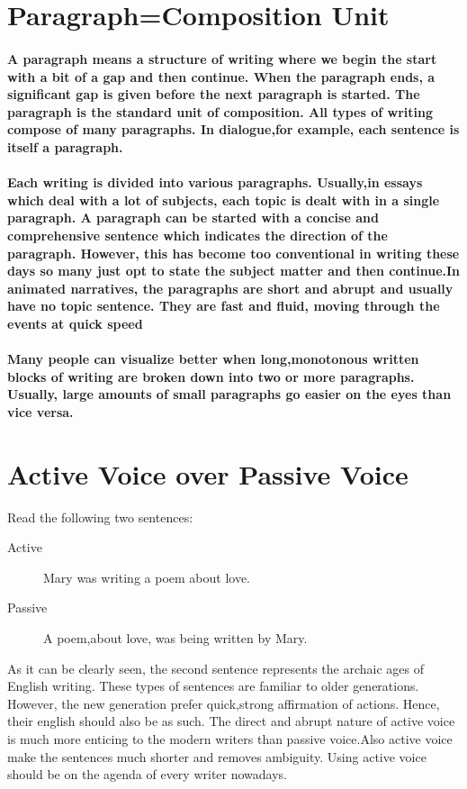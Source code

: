 \documentclass{report}
\begin{document}
\section{Paragraph=Composition Unit}
\paragraph{A paragraph means a structure of writing where we begin the start with a bit of a gap and then continue. When the paragraph ends, a significant gap is given before the next paragraph is started. The paragraph is the standard unit of composition. All types of writing compose of many paragraphs. In dialogue,for example, each sentence is itself a paragraph.}
\paragraph{Each writing is divided into various paragraphs. Usually,in essays which deal with a lot of subjects, each topic is dealt with in a single paragraph. A paragraph can be started with a concise and comprehensive sentence which indicates the direction of the paragraph. However, this has become too conventional in writing these days so many just opt to state the subject matter and then continue.In animated narratives, the paragraphs are short and abrupt and usually have no topic sentence. They are fast and fluid, moving through the events at quick speed}
\paragraph{Many people can visualize better when long,monotonous written blocks of writing are broken down into two or more paragraphs. Usually, large amounts of small paragraphs go easier on the eyes than vice versa.}
\section{Active Voice over Passive Voice}
Read the following two sentences:
\begin{description}
\item[Active] Mary was writing a poem about love.
\item[Passive] A poem,about love, was being written by Mary.
\end{description}
As it can be clearly seen, the second sentence represents the archaic ages of English writing. These types of sentences are familiar to older generations. However, the new generation prefer quick,strong affirmation of actions. Hence, their english should also be as such. The direct and abrupt nature of active voice is much more enticing to the modern writers than passive voice.Also active voice make the sentences much shorter and removes ambiguity. Using active voice should be on the agenda of every writer nowadays.
\end{document}
